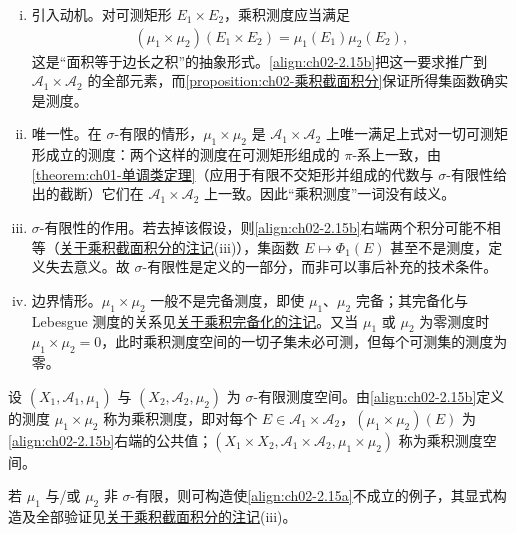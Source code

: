\documentclass[../../main.tex]{subfiles}%
\begin{document}
\begin{remark}\label{remark:ch02-乘积测度动机}
\begin{enumerate}[(i)]
\item 引入动机。对可测矩形 $E_1\times E_2$，乘积测度应当满足
\begin{align*}
(\mu_1\times\mu_2)(E_1\times E_2)=\mu_1(E_1)\mu_2(E_2),
\end{align*}
这是“面积等于边长之积”的抽象形式。\eqref{align:ch02-2.15b}把这一要求推广到 $\mathscr A_1\times\mathscr A_2$ 的全部元素，而\cref{proposition:ch02-乘积截面积分}保证所得集函数确实是测度。
\item 唯一性。在 $\sigma$-有限的情形，$\mu_1\times\mu_2$ 是 $\mathscr A_1\times\mathscr A_2$ 上唯一满足上式对一切可测矩形成立的测度：两个这样的测度在可测矩形组成的 $\pi$-系上一致，由\cref{theorem:ch01-单调类定理}（应用于有限不交矩形并组成的代数与 $\sigma$-有限性给出的截断）它们在 $\mathscr A_1\times\mathscr A_2$ 上一致。因此“乘积测度”一词没有歧义。
\item $\sigma$-有限性的作用。若去掉该假设，则\eqref{align:ch02-2.15b}右端两个积分可能不相等（\hyperref[remark:ch02-乘积截面积分动机]{关于乘积截面积分的注记}(iii)），集函数 $E\mapsto\Phi_1(E)$ 甚至不是测度，定义失去意义。故 $\sigma$-有限性是定义的一部分，而非可以事后补充的技术条件。
\item 边界情形。$\mu_1\times\mu_2$ 一般不是完备测度，即使 $\mu_1$、$\mu_2$ 完备；其完备化与 Lebesgue 测度的关系见\hyperref[remark:ch02-乘积完备化]{关于乘积完备化的注记}。又当 $\mu_1$ 或 $\mu_2$ 为零测度时 $\mu_1\times\mu_2=0$，此时乘积测度空间的一切子集未必可测，但每个可测集的测度为零。
\end{enumerate}
\end{remark}

\begin{definition}\label{definition:ch02-乘积测度}
设 $(X_1,\mathscr A_1,\mu_1)$ 与 $(X_2,\mathscr A_2,\mu_2)$ 为 $\sigma$-有限测度空间。由\eqref{align:ch02-2.15b}定义的测度 $\mu_1\times\mu_2$ 称为乘积测度，即对每个 $E\in\mathscr A_1\times\mathscr A_2$，$(\mu_1\times\mu_2)(E)$ 为\eqref{align:ch02-2.15b}右端的公共值；$(X_1\times X_2,\mathscr A_1\times\mathscr A_2,\mu_1\times\mu_2)$ 称为乘积测度空间。
\end{definition}

\begin{remark}\label{remark:ch02-sigma有限必要}
若 $\mu_1$ 与/或 $\mu_2$ 非 $\sigma$-有限，则可构造使\eqref{align:ch02-2.15a}不成立的例子，其显式构造及全部验证见\hyperref[remark:ch02-乘积截面积分动机]{关于乘积截面积分的注记}(iii)。
\end{remark}
\end{document}
